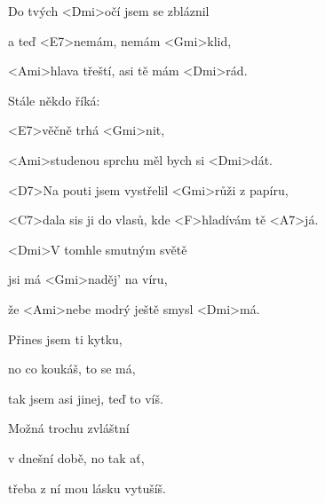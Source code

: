 

\zs
Do tvých <Dmi>očí jsem se zbláznil

a teď <E7>nemám, nemám <Gmi>klid,

<Ami>hlava třeští, asi tě mám <Dmi>rád.

Stále někdo říká: 

<E7>věčně trhá <Gmi>nit,

<Ami>studenou sprchu měl bych si <Dmi>dát.
\ks

\zr
<D7>Na pouti jsem vystřelil <Gmi>růži z papíru,

<C7>dala sis ji do vlasů, kde <F>hladívám tě <A7>já.

<Dmi>V tomhle smutným světě

jsi má <Gmi>naděj' na víru,

že <Ami>nebe modrý ještě smysl <Dmi>má.
\kr

\zs
Přines jsem ti kytku,

no co koukáš, to se má,

tak jsem asi jinej, teď to víš.

Možná trochu zvláštní

v dnešní době, no tak ať,

třeba z ní mou lásku vytušíš.
\ks

\zr \kr
\kp





